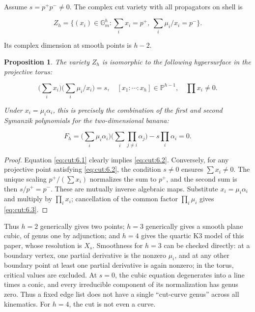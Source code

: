 \documentclass[11pt,a4paper,oneside]{article}
\theoremstyle{plain}
\newtheorem{proposition}[theorem]{Proposition}
\theoremstyle{definition}
\theoremstyle{remark}
\numberwithin{equation}{section}
\begin{document}
Assume \(s=p^+p^-\ne 0\). The complex cut variety with all propagators on shell is

\begin{equation}
Z_h=\{(x_i)\in\mathbb G_m^h:
             \sum_i x_i=p^+,\ \sum_i\mu_i/x_i=p^-\}.   \label{eq:cut:6.1}
\end{equation}

Its complex dimension at smooth points is \(h- 2\).

\begin{proposition}

\label{thm:cut:6.1} The variety \(Z_h\) is isomorphic to the following hypersurface in the projective torus:

\begin{equation}
\Big(\sum_i x_i\Big)\Big(\sum_i\mu_i/x_i\Big)=s,
 \quad[x_1:\cdots:x_h]\in\mathbb P^{h-1},\quad\prod x_i\ne0.
                                                               \label{eq:cut:6.2}
\end{equation}

Under \(x_i=\mu _i\alpha _i\), this is precisely the combination of the first and second Symanzik polynomials for the two-dimensional banana:

\begin{equation}
F_h=\Big(\sum_i\mu_i\alpha_i\Big)
               \Big(\sum_i\prod_{j\ne i}\alpha_j\Big)
                      -s\prod_i\alpha_i=0.             \label{eq:cut:6.3}
\end{equation}

\end{proposition}

\begin{proof}

Equation \eqref{eq:cut:6.1} clearly implies \eqref{eq:cut:6.2}. Conversely, for any projective point satisfying \eqref{eq:cut:6.2}, the condition \(s\ne 0\) ensures \(\sum x_i\ne 0\). The unique scaling \(p^+/(\sum x_i)\) normalizes the sum to \(p^+\), and the second sum is then \(s/p^+=p^-\). These are mutually inverse algebraic maps. Substitute \(x_i=\mu _i\alpha _i\) and multiply by \(\prod_i x_i\); cancellation of the common factor \(\prod_i \mu_i\) gives \eqref{eq:cut:6.3}.

\end{proof}

Thus \(h=2\) generically gives two points; \(h=3\) generically gives a smooth plane cubic, of genus one by adjunction; and \(h=4\) gives the quartic K3 model of this paper, whose resolution is \(X_s\). Smoothness for \(h=3\) can be checked directly: at a boundary vertex, one partial derivative is the nonzero \(\mu _i\), and at any other boundary point at least one partial derivative is again nonzero; in the torus, critical values are excluded. At \(s=0\), the cubic equation degenerates into a line times a conic, and every irreducible component of its normalization has genus zero. Thus a fixed edge list does not have a single ``cut-curve genus'' across all kinematics. For \(h=4\), the cut is not even a curve.
\end{document}
